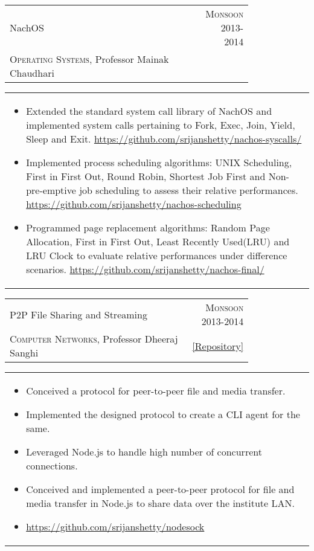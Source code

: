 \documentclass[a4paper,10pt]{article} %
\newcommand{\cproject}[5]{
    \begin{tabular}{p{0.80\linewidth}r}
        \textcolor{NavyBlue}{#2} & \multicolumn{1}{m{4cm}}{\raggedleft \textsc{#1}}\\
        #3 & #4
    \end{tabular}
    \begin{tabular}{p{\linewidth}}
    \vspace{-0.3cm}
        \footnotesize{#5}
    \end{tabular}
    \vspace{-0.5cm}
}
\newcommand{\lproject}[4]{
    \begin{tabular}{p{0.80\linewidth}r}
        \textcolor{NavyBlue}{#2} & \multicolumn{1}{m{4cm}}{\raggedleft \textsc{#1}}\\
        #3
    \end{tabular}
    \begin{tabular}{p{\linewidth}}
    \vspace{-0.3cm}
        \footnotesize{#4}
    \end{tabular}
    \vspace{-0.5cm}
}
\begin{document}
\lproject {Monsoon 2013-2014}
          {NachOS}
          {\textsc{Operating Systems}, Professor Mainak Chaudhari}
          {
             \begin{itemize}[leftmargin=0.5cm]
                 \item Extended the standard system call library of NachOS and implemented system calls pertaining to Fork, Exec,
                     Join, Yield, Sleep and Exit.
                     \href{https://github.com/srijanshetty/nachos-syscalls/}{https://github.com/srijanshetty/nachos-syscalls/}
                 \item Implemented process scheduling algorithms: UNIX Scheduling, First in First Out,
                     Round Robin, Shortest Job First and Non-pre-emptive job scheduling to assess their relative performances.
                     \href{https://github.com/srijanshetty/nachos-scheduling}{https://github.com/srijanshetty/nachos-scheduling}
                 \item Programmed page replacement algorithms: Random Page Allocation, First in First Out,
                     Least Recently Used(LRU) and LRU Clock to evaluate relative performances under difference scenarios.
                     \href{https://github.com/srijanshetty/nachos-final/}{https://github.com/srijanshetty/nachos-final/}
              \end{itemize}
          }

\cproject
    {Monsoon 2013-2014}
    {P2P File Sharing and Streaming}
    {\textsc{Computer Networks}, Professor Dheeraj Sanghi}
    { \href{https://github.com/srijanshetty/nodesock}{ \footnotesize{[Repository]} } }
          {
             \begin{itemize}[leftmargin=0.5cm]
                 \item Conceived a protocol for peer-to-peer file and media transfer.
                 \item Implemented the designed protocol to create a CLI agent for the same.
                 \item Leveraged Node.js to handle high number of concurrent connections.
                 \item Conceived and implemented a peer-to-peer protocol for file and media transfer in Node.js to share
                     data over the institute LAN.
                 \item \href{https://github.com/srijanshetty/nodesock}{https://github.com/srijanshetty/nodesock}
             \end{itemize}
          }
\end{document}
